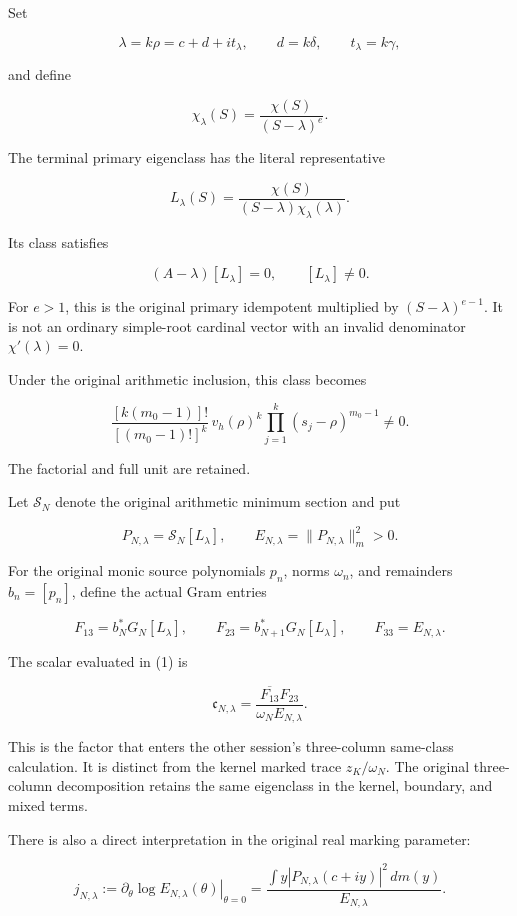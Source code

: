 Set

\[
\lambda=k\rho=c+d+it_\lambda,
\qquad
d=k\delta,\qquad t_\lambda=k\gamma,
\]

and define

\[
\chi_\lambda(S)=\frac{\chi(S)}{(S-\lambda)^e}.
\]

The terminal primary eigenclass has the literal representative

\[
L_\lambda(S)
=
\frac{\chi(S)}
{(S-\lambda)\chi_\lambda(\lambda)}.
\]

Its class satisfies

\[
(A-\lambda)[L_\lambda]=0,\qquad [L_\lambda]\ne0.
\]

For \(e>1\), this is the original primary idempotent multiplied by \((S-\lambda)^{e-1}\). It is not an ordinary simple-root cardinal vector with an invalid denominator \(\chi'(\lambda)=0\).

Under the original arithmetic inclusion, this class becomes

\[
\frac{[k(m_0-1)]!}{[(m_0-1)!]^k}
\,v_h(\rho)^k
\prod_{j=1}^{k}(s_j-\rho)^{m_0-1}\ne0.
\]

The factorial and full unit are retained.

Let \(\mathscr S_N\) denote the original arithmetic minimum section and put

\[
P_{N,\lambda}=\mathscr S_N[L_\lambda],
\qquad
E_{N,\lambda}=\|P_{N,\lambda}\|_m^2>0.
\]

For the original monic source polynomials \(p_n\), norms \(\omega_n\), and remainders \(b_n=[p_n]\), define the actual Gram entries

\[
F_{13}=b_N^*G_N[L_\lambda],
\qquad
F_{23}=b_{N+1}^*G_N[L_\lambda],
\qquad
F_{33}=E_{N,\lambda}.
\]

The scalar evaluated in (1) is

\[
\boxed{
\mathfrak c_{N,\lambda}
=
\frac{\overline{F_{13}}F_{23}}
{\omega_NE_{N,\lambda}}.
}
\tag{2}
\]

This is the factor that enters the other session's three-column same-class calculation. It is distinct from the kernel marked trace \(z_K/\omega_N\). The original three-column decomposition retains the same eigenclass in the kernel, boundary, and mixed terms.

There is also a direct interpretation in the original real marking parameter:

\[
j_{N,\lambda}
:=
\left.\partial_\theta\log E_{N,\lambda}(\theta)\right|_{\theta=0}
=
\frac{\displaystyle\int y|P_{N,\lambda}(c+iy)|^2\,dm(y)}
{E_{N,\lambda}}.
\]


